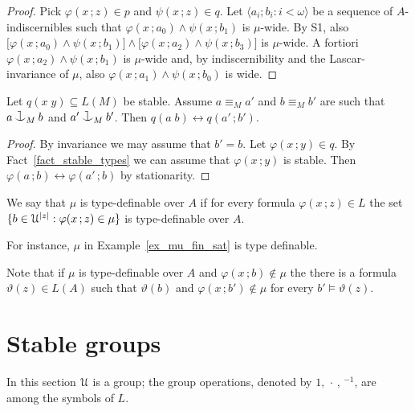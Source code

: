 \documentclass{amsproc}
\def\cnonfork{\mathbin{\raise1.8ex\rlap{\kern0.6ex\rule{0.6ex}{0.1ex}}\rlap{\kern1.1ex\rule{0.1ex}{1.9ex}}\raise-0.3ex\hbox{$\smile$} } }
\begin{document}
\begin{proof}
  Pick $\varphi(x\,;z)\in p$ and $\psi(x\,;z)\in q$.
  Let $\langle a_i;b_i: i<\omega\rangle$ be a sequence of $A$-indi\-scernibles such that $\varphi(x\,;a_0)\wedge \psi(x\,;b_1)$ is $\mu$-wide.
  By S1, also $\big[\varphi(x\,;a_0)\wedge \psi(x\,;b_1)\big]\wedge\big[\varphi(x\,;a_2)\wedge \psi(x\,;b_3)\big]$ is $\mu$-wide.
  A fortiori $\varphi(x\,;a_2)\wedge \psi(x\,;b_1)$ is $\mu$-wide and, by indiscernibility and the Lascar-invariance of $\mu$, also $\varphi(x\,;a_1)\wedge \psi(x\,;b_0)$ is wide.
\end{proof}

\begin{fact}
  Let $q(x\;y)\subseteq L(M)$ be stable.
  Assume $a\equiv_M a' $ and $b\equiv_Mb'$ are such that $a\cnonfork_M b$ and $a'\cnonfork_M b'$.
  Then $q(a\;b)\leftrightarrow q(a'\,;b')$.
\end{fact}

\begin{proof}
  By invariance we may assume that $b'=b$.
  Let $\varphi(x\,;y)\in q$.
  By Fact~\ref{fact_stable_types} we can assume that $\varphi(x\,;y)$ is stable.
  Then $\varphi(a\,;b)\leftrightarrow\varphi(a'\,;b)$ by stationarity.
\end{proof}

\begin{definition}
  We say that $\mu$ is type-definable over $A$ if for every formula $\varphi(x\,;z)\in L$ the set $\{b\in\EuScript U^{|z|} : \varphi(x\,;z)\in\mu\}$ is type-definable over $A$.
\end{definition}

For instance, $\mu$ in Example~\ref{ex_mu_fin_sat} is type definable.

Note that if $\mu$ is type-definable over $A$ and $\varphi(x\,;b)\notin\mu$ the there is a formula $\vartheta(z)\in L(A)$ such that $\vartheta(b)$ and $\varphi(x\,;b')\notin\mu$ for every $b'\models\vartheta(z)$.

\section{Stable groups}

In this section $\EuScript U$ is a group; the group operations, denoted by $1,\,\cdot\,,\,{}^{-1}$, are among the symbols of $L$.

\end{document}
